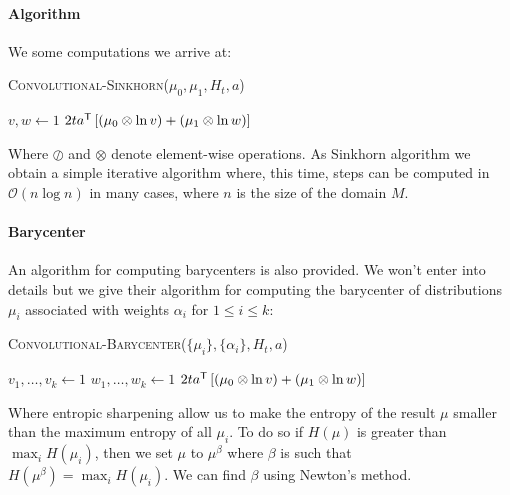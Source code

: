 \paragraph{Algorithm}
We some computations we arrive at:

\vspace{3mm}
\begin{algorithm}[H]
	\caption{\textsc{Convolutional-Sinkhorn}($\mu_0, \mu_1, H_t, a$)}
	$v, w \gets 1$ \;
	\Return $2t a^{\mathsf{T}} \left[ \left( \mu_0 \otimes \ln v \right) + \left( \mu_1 \otimes \ln w \right) \right]$
\end{algorithm}
\vspace{3mm}

Where $\oslash$ and $\otimes$ denote element-wise operations. As Sinkhorn algorithm we obtain a simple iterative algorithm where, this time, steps can be computed in $\mathcal{O}(n \log n)$ in many cases, where $n$ is the size of the domain $M$.

\paragraph{Barycenter}
An algorithm for computing barycenters is also provided. We won't enter into details but we give their algorithm for computing the barycenter of distributions $\mu_i$ associated with weights $\alpha_i$ for $1 \leqslant i \leqslant k$:

\vspace{3mm}
\begin{algorithm}[H]
	\caption{\textsc{Convolutional-Barycenter}($\{\mu_i\}, \{ \alpha_i \}, H_t, a$)}
	$v_1, \dots, v_k \gets 1$ \;
	$w_1, \dots, w_k \gets 1$ \;
	\Return $2t a^{\mathsf{T}} \left[ \left( \mu_0 \otimes \ln v \right) + \left( \mu_1 \otimes \ln w \right) \right]$
\end{algorithm}
\vspace{3mm}
Where entropic sharpening allow us to make the entropy of the result $\mu$ smaller than the maximum entropy of all $\mu_i$. To do so if $H(\mu)$ is greater than $\max_i H(\mu_i)$, then we set $\mu$ to $\mu^\beta$ where $\beta$ is such that $H(\mu^\beta) = \max_i H(\mu_i)$. We can find $\beta$ using Newton's method.

